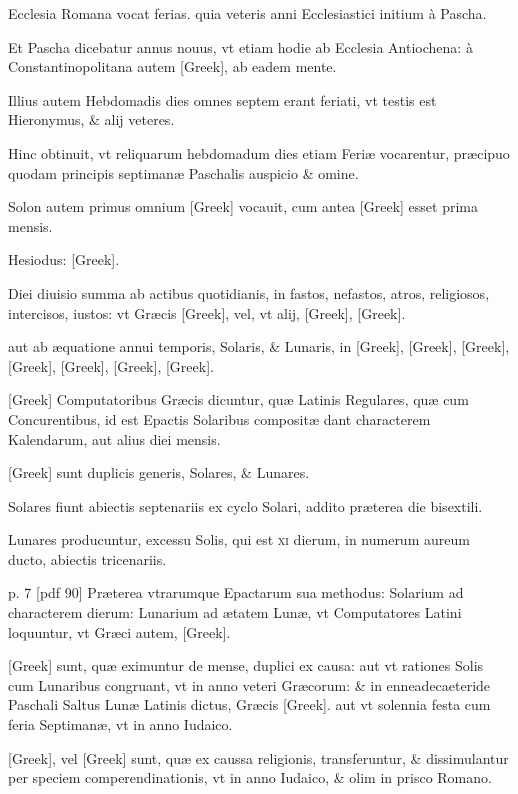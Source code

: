 Ecclesia Romana vocat ferias. quia veteris anni Ecclesiastici initium
à Pascha.

Et Pascha dicebatur annus nouus, vt etiam hodie ab Ecclesia
Antiochena: à Constantinopolitana autem \textgreek{[Greek]},
ab eadem mente.

Illius autem Hebdomadis dies omnes septem erant 
feriati, vt testis est Hieronymus, \& alij veteres.

Hinc obtinuit, vt reliquarum
hebdomadum dies etiam Feriæ vocarentur, præcipuo quodam
principis septimanæ Paschalis auspicio \& omine.

Solon autem
primus omnium \textgreek{[Greek]} vocauit, cum antea \textgreek{[Greek]} esset
prima mensis.

Hesiodus: \textgreek{[Greek]}.

Diei diuisio summa ab actibus quotidianis, in fastos, nefastos, atros,
religiosos, intercisos, iustos: vt Græcis \textgreek{[Greek]}, vel, vt alij,
\textgreek{[Greek]}, \textgreek{[Greek]}.

aut ab æquatione annui
temporis, Solaris, \& Lunaris, in \textgreek{[Greek]}, \textgreek{[Greek]},
\textgreek{[Greek]}, \textgreek{[Greek]}, \textgreek{[Greek]},
\textgreek{[Greek]}, \textgreek{[Greek]}.

\textgreek{[Greek]} Computatoribus
Græcis dicuntur, quæ Latinis Regulares, quæ cum  Concurentibus,
id est Epactis Solaribus compositæ dant characterem Kalendarum,
aut alius diei mensis.

\textgreek{[Greek]} sunt duplicis generis, Solares, \&
Lunares.

Solares fiunt abiectis septenariis ex cyclo Solari, addito præterea
die bisextili.

Lunares producuntur, excessu Solis, qui est \textsc{xi} dierum,
in numerum aureum ducto, abiectis tricenariis.

%

p. 7 [pdf 90]
%
Præterea vtrarumque
Epactarum sua methodus: Solarium ad characterem dierum:
Lunarium ad ætatem Lunæ, vt Computatores Latini loquuntur, vt
Græci autem, \textgreek{[Greek]}.

\textgreek{[Greek]} sunt, quæ eximuntur de
mense, duplici ex causa: aut vt rationes Solis cum Lunaribus congruant,
vt in anno veteri Græcorum: \& in enneadecaeteride Paschali
Saltus Lunæ Latinis dictus, Græcis \textgreek{[Greek]}. aut vt solennia
festa cum feria Septimanæ, vt in anno Iudaico.

\textgreek{[Greek]}, vel \textgreek{[Greek]}
sunt, quæ ex caussa religionis, transferuntur, \& dissimulantur per speciem
comperendinationis, vt in anno Iudaico, \& olim in prisco Romano.

